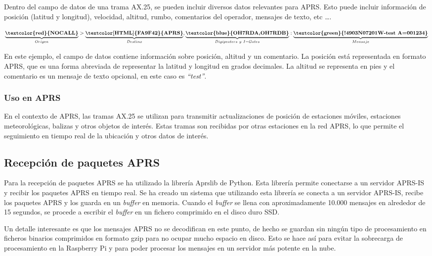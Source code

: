 Dentro del campo de datos de una trama AX.25, se pueden incluir diversos datos relevantes para APRS. Esto puede incluir información de posición (latitud y longitud), velocidad, altitud, rumbo, comentarios del operador, mensajes de texto, etc \ldots \cite{APRSPaths}\cite{APRS}.

\[\underbrace{\textbf{\textcolor{red}{NOCALL}}}_{Origen}>\underbrace{\textbf{\textcolor[HTML]{FA9F42}{APRS}}}_{Destino}, \underbrace{\textbf{\textcolor{blue}{OH7RDA,OH7RDB}}}_{Digipeaters\ y\ I-Gates}:\underbrace{\textbf{\textcolor{green}{!4903N07201W-test A=001234}}}_{Mensaje}\]

En este ejemplo, el campo de datos contiene información sobre posición, altitud y un comentario. La posición está representada en formato APRS, que es una forma abreviada de representar la latitud y longitud en grados decimales. La altitud se representa en pies y el comentario es un mensaje de texto opcional, en este caso es \textit{``test''}.

\subsubsection*{Uso en APRS}

En el contexto de APRS, las tramas AX.25 se utilizan para transmitir actualizaciones de posición de estaciones móviles, estaciones meteorológicas, balizas y otros objetos de interés. Estas tramas son recibidas por otras estaciones en la red APRS, lo que permite el seguimiento en tiempo real de la ubicación y otros datos de interés.

\subsection{Recepción de paquetes APRS}

Para la recepción de paquetes APRS se ha utilizado la librería Aprslib de Python. Esta librería permite conectarse a un servidor APRS-IS y recibir los paquetes APRS en tiempo real. Se ha creado un sistema que utilizando esta librería se conecta a un servidor APRS-IS, recibe los paquetes APRS y los guarda en un \textit{buffer} en memoria. Cuando el \textit{buffer} se llena con aproximadamente 10.000 mensajes en alrededor de 15 segundos, se procede a escribir el \textit{buffer} en un fichero comprimido en el disco duro SSD.

Un detalle interesante es que los mensajes APRS no se decodifican en este punto, de hecho se guardan sin ningún tipo de procesamiento en ficheros binarios comprimidos en formato gzip para no ocupar mucho espacio en disco. Esto se hace así para evitar la sobrecarga de procesamiento en la Raspberry Pi y para poder procesar los mensajes en un servidor más potente en la nube.

